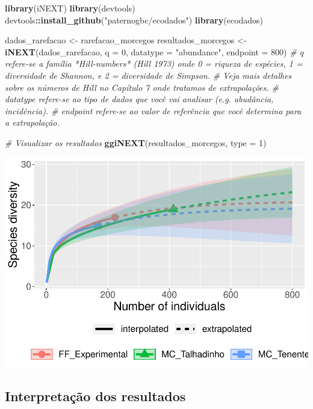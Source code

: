 \documentclass[
]{book}
\newenvironment{Shaded}{\begin{snugshade}}{\end{snugshade}}
\newcommand{\CommentTok}[1]{\textcolor[rgb]{0.56,0.35,0.01}{\textit{#1}}}
\newcommand{\DataTypeTok}[1]{\textcolor[rgb]{0.13,0.29,0.53}{#1}}
\newcommand{\DecValTok}[1]{\textcolor[rgb]{0.00,0.00,0.81}{#1}}
\newcommand{\KeywordTok}[1]{\textcolor[rgb]{0.13,0.29,0.53}{\textbf{#1}}}
\newcommand{\NormalTok}[1]{#1}
\newcommand{\OperatorTok}[1]{\textcolor[rgb]{0.81,0.36,0.00}{\textbf{#1}}}
\newcommand{\StringTok}[1]{\textcolor[rgb]{0.31,0.60,0.02}{#1}}
\begin{document}
\begin{Shaded}
\begin{Highlighting}[]
\KeywordTok{library}\NormalTok{(iNEXT)}
\KeywordTok{library}\NormalTok{(devtools)}
\NormalTok{devtools}\OperatorTok{::}\KeywordTok{install_github}\NormalTok{(}\StringTok{"paternogbc/ecodados"}\NormalTok{)}
\KeywordTok{library}\NormalTok{(ecodados)}

\NormalTok{dados_rarefacao <-}\StringTok{ }\NormalTok{rarefacao_morcegos}
\NormalTok{resultados_morcegos <-}\StringTok{ }\KeywordTok{iNEXT}\NormalTok{(dados_rarefacao, }\DataTypeTok{q =} \DecValTok{0}\NormalTok{, }\DataTypeTok{datatype =} \StringTok{"abundance"}\NormalTok{, }\DataTypeTok{endpoint =} \DecValTok{800}\NormalTok{)}
\CommentTok{# q refere-se a família *Hill-numbers* (Hill 1973) onde 0 = riqueza de espécies, 1 =  diversidade de Shannon, e 2 = diversidade de Simpson.}
\CommentTok{# Veja mais detalhes sobre os números de Hill no Capítulo 7 onde tratamos de extrapolações.}
\CommentTok{# datatype refere-se ao tipo de dados que você vai analisar (e.g. abudância, incidência).}
\CommentTok{# endpoint refere-se ao valor de referência que você determina para a extrapolação.}

\CommentTok{# Visualizar os resultados }
\KeywordTok{ggiNEXT}\NormalTok{(resultados_morcegos, }\DataTypeTok{type =} \DecValTok{1}\NormalTok{)}
\end{Highlighting}
\end{Shaded}

\includegraphics{livro_r_ecologia_files/figure-latex/unnamed-chunk-17-1.pdf}

\hypertarget{interpretauxe7uxe3o-dos-resultados}{%
\subsection{Interpretação dos resultados}\label{interpretauxe7uxe3o-dos-resultados}}
\end{document}
